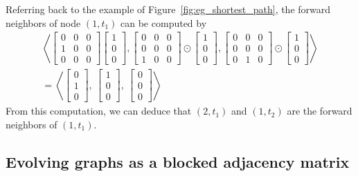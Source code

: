 \documentclass[10pt,conference,compsocconf]{IEEEtran}
\theoremstyle{definition}
\begin{document}
Referring back to the example of Figure~\ref{fig:eg_shortest_path}, the forward
neighbors of node $(1, t_1)$ can be computed by
\begin{align*}
\left\langle
  \begin{bmatrix}
    0 & 0 & 0 \\
    1 & 0 & 0 \\
    0 & 0 & 0
  \end{bmatrix}\!\!\!\!
\begin{bmatrix}
1 \\
0 \\
0
\end{bmatrix}\!,
 \begin{bmatrix}
   0 & 0 & 0 \\
   0 & 0 & 0 \\
   1 & 0 & 0
 \end{bmatrix}\!\!
\odot\!\!
\begin{bmatrix}
1 \\
0 \\
0
\end{bmatrix}\!,
 \begin{bmatrix}
  0 & 0 & 0 \\
  0 & 0 & 0 \\
  0 & 1 & 0
 \end{bmatrix}\!\!
\odot\!\!
\begin{bmatrix}
1 \\
0 \\
0
\end{bmatrix}\!
\right\rangle
\\
=
\left\langle
\begin{bmatrix}
0 \\
1 \\
0
\end{bmatrix},~
\begin{bmatrix}
1 \\
0 \\
0
\end{bmatrix},~
\begin{bmatrix}
0 \\
0 \\
0
\end{bmatrix}
\right\rangle
\end{align*}
From this computation, we can deduce that $(2,t_1)$ and $(1,t_2)$ are the forward
neighbors of $(1,t_1)$.


\subsection{Evolving graphs as a blocked adjacency matrix}
\end{document}
